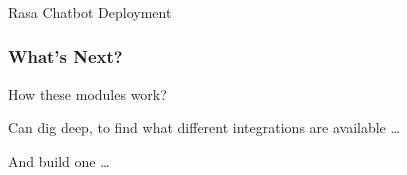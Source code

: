 \begin{frame}[fragile]\frametitle{}
\begin{center}
{\Large Rasa Chatbot Deployment}

\end{center}
\end{frame}


\begin{frame}[fragile]\frametitle{What's Next?}
How these modules work? 

Can dig deep, to find what different integrations are available \ldots

And build one \ldots

\end{frame}
